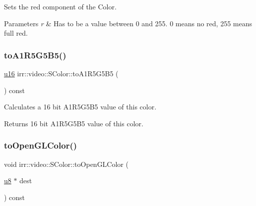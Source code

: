 Sets the red component of the Color. 


\begin{DoxyParams}{Parameters}
{\em r} & Has to be a value between 0 and 255. 0 means no red, 255 means full red. \\
\hline
\end{DoxyParams}
\mbox{\label{classirr_1_1video_1_1SColor_aaa60619bb953ba3fd472b0193eda558e}} 
\subsubsection{\texorpdfstring{to\+A1\+R5\+G5\+B5()}{toA1R5G5B5()}}
{\footnotesize\ttfamily \hyperlink{namespaceirr_ae9f8ec82692ad3b83c21f555bfa70bcc}{u16} irr\+::video\+::\+S\+Color\+::to\+A1\+R5\+G5\+B5 (\begin{DoxyParamCaption}{ }\end{DoxyParamCaption}) const\hspace{0.3cm}{\ttfamily [inline]}}



Calculates a 16 bit A1\+R5\+G5\+B5 value of this color. 

\begin{DoxyReturn}{Returns}
16 bit A1\+R5\+G5\+B5 value of this color. 
\end{DoxyReturn}
\mbox{\label{classirr_1_1video_1_1SColor_a4251509c429bdc125660c59170b50a2e}} 
\subsubsection{\texorpdfstring{to\+Open\+G\+L\+Color()}{toOpenGLColor()}}
{\footnotesize\ttfamily void irr\+::video\+::\+S\+Color\+::to\+Open\+G\+L\+Color (\begin{DoxyParamCaption}\item[{\hyperlink{namespaceirr_a646874f69af8ff87fc10201b0254a761}{u8} $\ast$}]{dest }\end{DoxyParamCaption}) const\hspace{0.3cm}{\ttfamily [inline]}}



